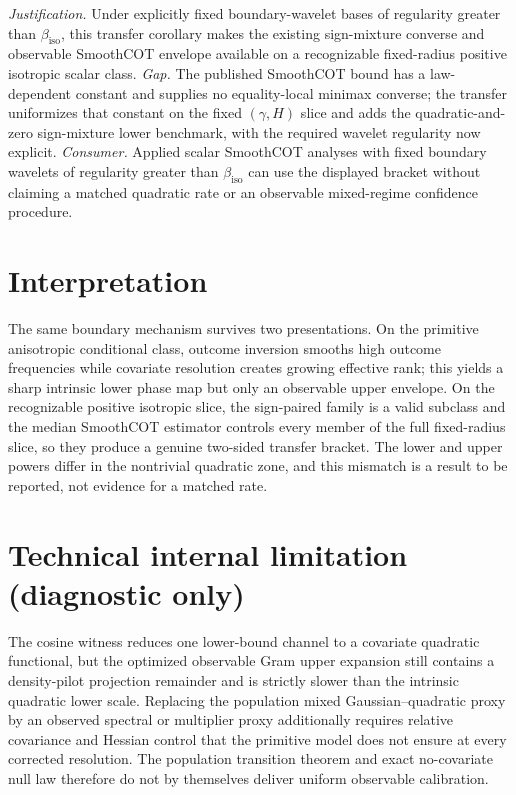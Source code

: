 \documentclass{article}
\begin{document}
\par\smallskip\noindent \textit{Justification.} Under explicitly fixed boundary-wavelet bases of regularity greater than \(\beta_{\mathrm{iso}}\), this transfer corollary makes the existing sign-mixture converse and observable SmoothCOT envelope available on a recognizable fixed-radius positive isotropic scalar class. \textit{Gap.} The published SmoothCOT bound has a law-dependent constant and supplies no equality-local minimax converse; the transfer uniformizes that constant on the fixed \((\gamma,H)\) slice and adds the quadratic-and-zero sign-mixture lower benchmark, with the required wavelet regularity now explicit. \textit{Consumer.} Applied scalar SmoothCOT analyses with fixed boundary wavelets of regularity greater than \(\beta_{\mathrm{iso}}\) can use the displayed bracket without claiming a matched quadratic rate or an observable mixed-regime confidence procedure.

\section{Interpretation}

The same boundary mechanism survives two presentations. On the primitive anisotropic conditional class, outcome inversion smooths high outcome frequencies while covariate resolution creates growing effective rank; this yields a sharp intrinsic lower phase map but only an observable upper envelope. On the recognizable positive isotropic slice, the sign-paired family is a valid subclass and the median SmoothCOT estimator controls every member of the full fixed-radius slice, so they produce a genuine two-sided transfer bracket. The lower and upper powers differ in the nontrivial quadratic zone, and this mismatch is a result to be reported, not evidence for a matched rate.

\section*{Technical internal limitation (diagnostic only)}

The cosine witness reduces one lower-bound channel to a covariate quadratic functional, but the optimized observable Gram upper expansion still contains a density-pilot projection remainder and is strictly slower than the intrinsic quadratic lower scale. Replacing the population mixed Gaussian--quadratic proxy by an observed spectral or multiplier proxy additionally requires relative covariance and Hessian control that the primitive model does not ensure at every corrected resolution. The population transition theorem and exact no-covariate null law therefore do not by themselves deliver uniform observable calibration.
\end{document}
